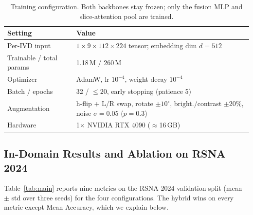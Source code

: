\documentclass[runningheads]{llncs}
\begin{document}
\begin{table}[t]
\centering
\caption{Training configuration. Both backbones stay frozen; only the fusion MLP and slice-attention pool are trained.}
\label{tab:config}
\footnotesize
\begin{tabular}{@{}l p{8.1cm}@{}}
\toprule
Setting & Value \\
\midrule
Per-IVD input & $1\times9\times112\times224$ tensor; embedding dim $d=512$ \\
Trainable / total params & 1.18\,M / 260\,M \\
Optimizer & AdamW, lr $10^{-4}$, weight decay $10^{-4}$ \\
Batch / epochs & 32 / $\leq$20, early stopping (patience 5) \\
Augmentation & h-flip + L/R swap, rotate $\pm10^{\circ}$, bright./contrast $\pm20\%$, noise $\sigma{=}0.05$ ($p{=}0.3$) \\
Hardware & 1$\times$ NVIDIA RTX 4090 ($\approx$16\,GB) \\
\bottomrule
\end{tabular}
\end{table}

\subsection{In-Domain Results and Ablation on RSNA 2024}\label{exp2}

Table~\ref{tab:main} reports nine metrics on the RSNA 2024 validation split (mean $\pm$ std over three seeds) for the four configurations. The hybrid wins on every metric except Mean Accuracy, which we explain below.
\end{document}
